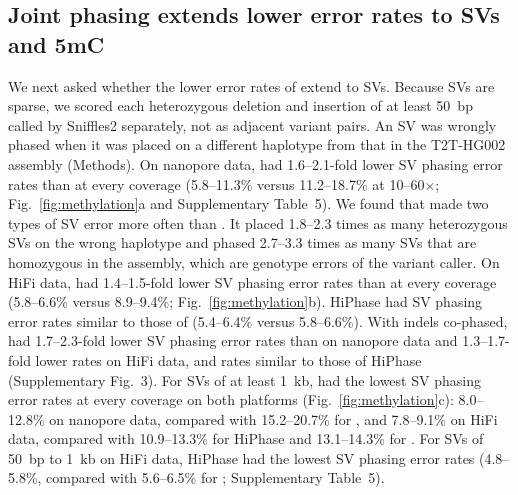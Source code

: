 \subsection*{Joint phasing extends lower error rates to SVs and 5mC}
We next asked whether the lower error rates of \toolname extend to SVs. Because SVs are sparse, we scored each heterozygous deletion and insertion of at least 50~bp called by Sniffles2 separately, not as adjacent variant pairs. An SV was wrongly phased when it was placed on a different haplotype from that in the T2T-HG002 assembly (Methods). On nanopore data, \toolname had 1.6--2.1-fold lower SV phasing error rates than \whatshap at every coverage (5.8--11.3\% versus 11.2--18.7\% at 10--60$\times$; Fig.~\ref{fig:methylation}a and Supplementary Table~5). We found that \whatshap made two types of SV error more often than \toolname. It placed 1.8--2.3 times as many heterozygous SVs on the wrong haplotype and phased 2.7--3.3 times as many SVs that are homozygous in the assembly, which are genotype errors of the variant caller. On HiFi data, \toolname had 1.4--1.5-fold lower SV phasing error rates than \whatshap at every coverage (5.8--6.6\% versus 8.9--9.4\%; Fig.~\ref{fig:methylation}b). HiPhase had SV phasing error rates similar to those of \toolname (5.4--6.4\% versus 5.8--6.6\%). With indels co-phased, \toolname had 1.7--2.3-fold lower SV phasing error rates than \whatshap on nanopore data and 1.3--1.7-fold lower rates on HiFi data, and rates similar to those of HiPhase (Supplementary Fig.~3). For SVs of at least 1~kb, \toolname had the lowest SV phasing error rates at every coverage on both platforms (Fig.~\ref{fig:methylation}c): 8.0--12.8\% on nanopore data, compared with 15.2--20.7\% for \whatshap, and 7.8--9.1\% on HiFi data, compared with 10.9--13.3\% for HiPhase and 13.1--14.3\% for \whatshap. For SVs of 50~bp to 1~kb on HiFi data, HiPhase had the lowest SV phasing error rates (4.8--5.8\%, compared with 5.6--6.5\% for \toolname; Supplementary Table~5).
